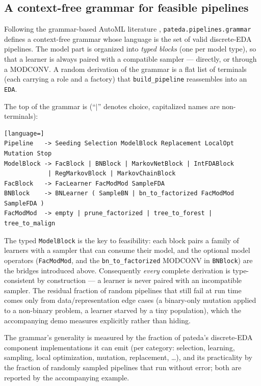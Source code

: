 \documentclass[a4paper,11pt]{article}
\begin{document}
\subsection{A context-free grammar for feasible pipelines}

Following the grammar-based AutoML literature \citep{deSa_et_al:2017,Marinescu_et_al:2021}, \texttt{pateda.pipelines.grammar} defines a context-free grammar whose language is the set of valid discrete-EDA pipelines.  The model part is organized into \emph{typed blocks} (one per model type), so that a learner is always paired with a compatible sampler --- directly, or through a MODCONV.  A random derivation of the grammar is a flat list of terminals (each carrying a role and a factory) that \texttt{build\_pipeline} reassembles into an \texttt{EDA}.

The top of the grammar is (``$|$'' denotes choice, capitalized names are
non-terminals):

\begin{lstlisting}[language=]
Pipeline   -> Seeding Selection ModelBlock Replacement LocalOpt Mutation Stop
ModelBlock -> FacBlock | BNBlock | MarkovNetBlock | IntFDABlock
            | RegMarkovBlock | MarkovChainBlock
FacBlock   -> FacLearner FacModMod SampleFDA
BNBlock    -> BNLearner ( SampleBN | bn_to_factorized FacModMod SampleFDA )
FacModMod  -> empty | prune_factorized | tree_to_forest | tree_to_malign
\end{lstlisting}

The typed \texttt{ModelBlock} is the key to feasibility: each block pairs a family
of learners with a sampler that can consume their model, and the optional model
operators (\texttt{FacModMod}, and the \texttt{bn\_to\_factorized} MODCONV in
\texttt{BNBlock}) are the bridges introduced above. Consequently \emph{every}
complete derivation is type-consistent by construction --- a learner is never
paired with an incompatible sampler. The residual fraction of random pipelines
that still fail at run time comes only from data/representation edge cases
(a binary-only mutation applied to a non-binary problem, a learner starved by a
tiny population), which the accompanying demo measures explicitly rather than
hiding.

The grammar's generality is measured by the fraction of pateda's discrete-EDA component implementations it can emit (per category: selection, learning, sampling, local optimization, mutation, replacement, \ldots), and its practicality by the fraction of randomly sampled pipelines that run without error; both are reported by the accompanying example.
\end{document}
